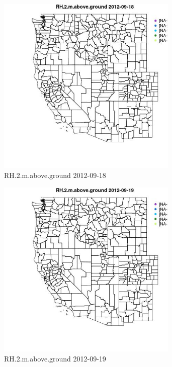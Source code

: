\begin{figure} 
\centering  
\includegraphics[width=0.77\textwidth]{Code_Outputs/ML_input_report_ML_input_PM25_Step5_part_d_de_duplicated_aves_ML_input_MapObsRH2maboveground2012-09-18.jpg} 
\caption{\label{fig:ML_input_report_ML_input_PM25_Step5_part_d_de_duplicated_aves_ML_inputMapObsRH2maboveground2012-09-18}RH.2.m.above.ground 2012-09-18} 
\end{figure} 
 

\begin{figure} 
\centering  
\includegraphics[width=0.77\textwidth]{Code_Outputs/ML_input_report_ML_input_PM25_Step5_part_d_de_duplicated_aves_ML_input_MapObsRH2maboveground2012-09-19.jpg} 
\caption{\label{fig:ML_input_report_ML_input_PM25_Step5_part_d_de_duplicated_aves_ML_inputMapObsRH2maboveground2012-09-19}RH.2.m.above.ground 2012-09-19} 
\end{figure} 
 

